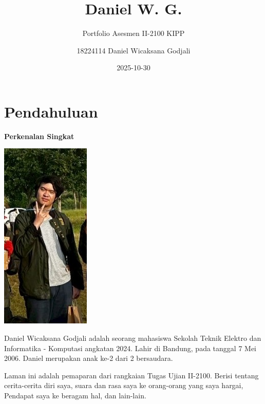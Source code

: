 \documentclass[
  letterpaper,
  DIV=11,
  numbers=noendperiod]{scrreprt}
\title{Daniel W. G.}
\subtitle{Portfolio Asesmen II-2100 KIPP}
\author{18224114 Daniel Wicaksana Godjali}
\date{2025-10-30}
\renewcommand*\contentsname{Table of contents}
\newcommand\contentsname{Table of contents}
\begin{document}
\maketitle

\renewcommand*\contentsname{Table of contents}
{
\hypersetup{linkcolor=}
\setcounter{tocdepth}{2}
\tableofcontents
}


\chapter*{Pendahuluan}\label{pendahuluan}


\textbf{Perkenalan Singkat}

\includegraphics[width=0.5\linewidth,height=\textheight,keepaspectratio]{images/LANTIK.jpg}

Daniel Wicaksana Godjali adalah seorang mahasiswa Sekolah Teknik Elektro
dan Informatika - Komputasi angkatan 2024. Lahir di Bandung, pada
tanggal 7 Mei 2006. Daniel merupakan anak ke-2 dari 2 bersaudara.

Laman ini adalah pemaparan dari rangkaian Tugas Ujian II-2100. Berisi
tentang cerita-cerita diri saya, suara dan rasa saya ke orang-orang yang
saya hargai, Pendapat saya ke beragam hal, dan lain-lain.
\end{document}
